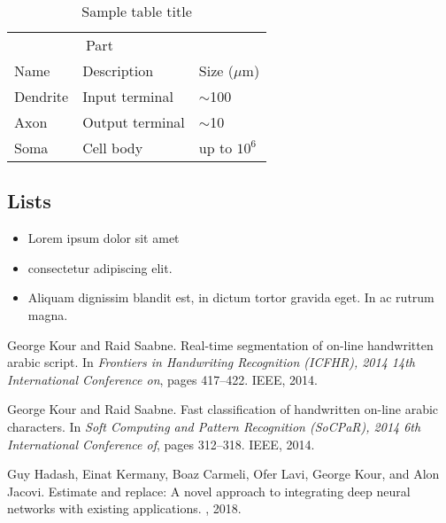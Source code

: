 \documentclass{article}
\begin{document}
\begin{table}
 \caption{Sample table title}
  \centering
  \begin{tabular}{lll}
    \toprule
    \multicolumn{2}{c}{Part}                   \\
    \cmidrule(r){1-2}
    Name     & Description     & Size ($\mu$m) \\
    \midrule
    Dendrite & Input terminal  & $\sim$100     \\
    Axon     & Output terminal & $\sim$10      \\
    Soma     & Cell body       & up to $10^6$  \\
    \bottomrule
  \end{tabular}
  \label{tab:table}
\end{table}

\subsection{Lists}
\begin{itemize}
\item Lorem ipsum dolor sit amet
\item consectetur adipiscing elit. 
\item Aliquam dignissim blandit est, in dictum tortor gravida eget. In ac rutrum magna.
\end{itemize}


  


\begin{thebibliography}{1}

George Kour and Raid Saabne.
\newblock Real-time segmentation of on-line handwritten arabic script.
\newblock In {\em Frontiers in Handwriting Recognition (ICFHR), 2014 14th
  International Conference on}, pages 417--422. IEEE, 2014.

George Kour and Raid Saabne.
\newblock Fast classification of handwritten on-line arabic characters.
\newblock In {\em Soft Computing and Pattern Recognition (SoCPaR), 2014 6th
  International Conference of}, pages 312--318. IEEE, 2014.

Guy Hadash, Einat Kermany, Boaz Carmeli, Ofer Lavi, George Kour, and Alon
  Jacovi.
\newblock Estimate and replace: A novel approach to integrating deep neural
  networks with existing applications.
, 2018.

\end{thebibliography}
\end{document}
